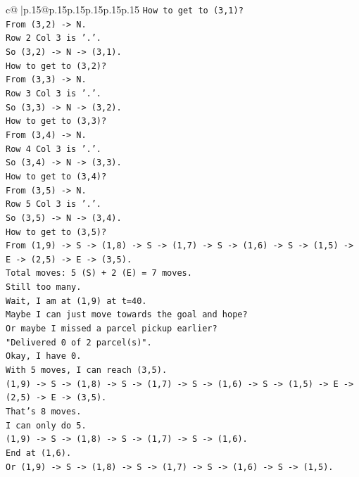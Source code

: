 \documentclass{article}
\begin{document}
{\begin{supertabular}{c@{$\;$}|p{.15\linewidth}@{}p{.15\linewidth}p{.15\linewidth}p{.15\linewidth}p{.15\linewidth}p{.15\linewidth}}
{{{\texttt{How to get to (3,1)?} \\
\texttt{From (3,2) {-}> N.} \\
\texttt{Row 2 Col 3 is '.'.} \\
\texttt{So (3,2) {-}> N {-}> (3,1).} \\
\texttt{How to get to (3,2)?} \\
\texttt{From (3,3) {-}> N.} \\
\texttt{Row 3 Col 3 is '.'.} \\
\texttt{So (3,3) {-}> N {-}> (3,2).} \\
\texttt{How to get to (3,3)?} \\
\texttt{From (3,4) {-}> N.} \\
\texttt{Row 4 Col 3 is '.'.} \\
\texttt{So (3,4) {-}> N {-}> (3,3).} \\
\texttt{How to get to (3,4)?} \\
\texttt{From (3,5) {-}> N.} \\
\texttt{Row 5 Col 3 is '.'.} \\
\texttt{So (3,5) {-}> N {-}> (3,4).} \\
\texttt{How to get to (3,5)?} \\
\texttt{From (1,9) {-}> S {-}> (1,8) {-}> S {-}> (1,7) {-}> S {-}> (1,6) {-}> S {-}> (1,5) {-}> E {-}> (2,5) {-}> E {-}> (3,5).} \\
\texttt{Total moves: 5 (S) + 2 (E) = 7 moves.} \\
\texttt{Still too many.} \\
\texttt{Wait, I am at (1,9) at t=40.} \\
\texttt{Maybe I can just move towards the goal and hope?} \\
\texttt{Or maybe I missed a parcel pickup earlier?} \\
\texttt{"Delivered 0 of 2 parcel(s)".} \\
\texttt{Okay, I have 0.} \\
\texttt{With 5 moves, I can reach (3,5).} \\
\texttt{(1,9) {-}> S {-}> (1,8) {-}> S {-}> (1,7) {-}> S {-}> (1,6) {-}> S {-}> (1,5) {-}> E {-}> (2,5) {-}> E {-}> (3,5).} \\
\texttt{That's 8 moves.} \\
\texttt{I can only do 5.} \\
\texttt{(1,9) {-}> S {-}> (1,8) {-}> S {-}> (1,7) {-}> S {-}> (1,6).} \\
\texttt{End at (1,6).} \\
\texttt{Or (1,9) {-}> S {-}> (1,8) {-}> S {-}> (1,7) {-}> S {-}> (1,6) {-}> S {-}> (1,5).} \\
}}}
\end{supertabular}}
\end{document}
